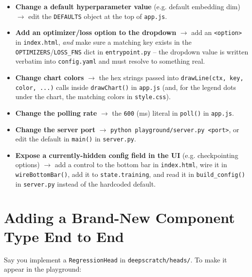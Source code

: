 \documentclass[11pt]{article}
\begin{document}
\begin{itemize}
  \item \textbf{Change a default hyperparameter value} (e.g. default
  embedding dim) $\to$ edit the \lstinline{DEFAULTS} object at the top of
  \lstinline{app.js}.
  \item \textbf{Add an optimizer/loss option to the dropdown} $\to$ add an
  \lstinline{<option>} in \lstinline{index.html}, \emph{and} make sure a
  matching key exists in the \lstinline{OPTIMIZERS}/\lstinline{LOSS_FNS}
  dict in \lstinline{entrypoint.py} -- the dropdown value is written verbatim
  into \lstinline{config.yaml} and must resolve to something real.
  \item \textbf{Change chart colors} $\to$ the hex strings passed into
  \lstinline{drawLine(ctx, key, color, ...)} calls inside
  \lstinline{drawChart()} in \lstinline{app.js} (and, for the legend dots
  under the chart, the matching colors in \lstinline{style.css}).
  \item \textbf{Change the polling rate} $\to$ the \lstinline{600} (ms)
  literal in \lstinline{poll()} in \lstinline{app.js}.
  \item \textbf{Change the server port} $\to$
  \lstinline{python playground/server.py <port>}, or edit the default in
  \lstinline{main()} in \lstinline{server.py}.
  \item \textbf{Expose a currently-hidden config field in the UI} (e.g.
  checkpointing options) $\to$ add a control to the bottom bar in
  \lstinline{index.html}, wire it in \lstinline{wireBottomBar()}, add it to
  \lstinline{state.training}, and read it in \lstinline{build_config()} in
  \lstinline{server.py} instead of the hardcoded default.
\end{itemize}

\section{Adding a Brand-New Component Type End to End}
\label{sec:new-component}

Say you implement a \lstinline{RegressionHead} in
\lstinline{deepscratch/heads/}. To make it appear in the playground:
\end{document}
